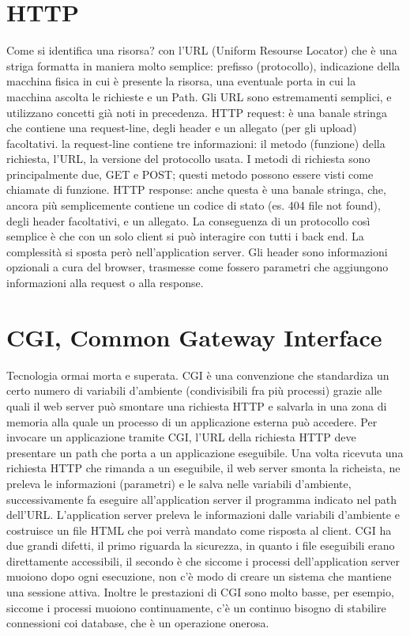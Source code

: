 \section{HTTP}
Come si identifica una risorsa? con l'URL (Uniform Resourse Locator) che è una striga formatta in maniera molto semplice: prefisso (protocollo), indicazione della macchina fisica in cui è presente la risorsa, una eventuale porta in cui la macchina ascolta le richieste e un Path. Gli URL sono estremamenti semplici, e utilizzano concetti già noti in precedenza.\newline
HTTP request: è una banale stringa che contiene una request-line, degli header e un allegato (per gli upload) facoltativi. la request-line contiene tre informazioni: il metodo (funzione) della richiesta, l'URL, la versione del protocollo usata. I metodi di richiesta sono principalmente due, GET e POST; questi metodo possono essere visti come chiamate di funzione.\newline
HTTP response: anche questa è una banale stringa, che, ancora più semplicemente contiene un codice di stato (es. 404 file not found), degli header facoltativi, e un allegato.\newline
La conseguenza di un protocollo così semplice è che con un solo client si può interagire con tutti i back end. La complessità si sposta però nell'application server.\newline
Gli header sono informazioni opzionali a cura del browser, trasmesse come fossero parametri che aggiungono informazioni alla request o alla response.
\section{CGI, Common Gateway Interface}
Tecnologia ormai morta e superata.\newline
CGI è una convenzione che standardiza un certo numero di variabili d'ambiente (condivisibili fra più processi) grazie alle quali il web server può smontare una richiesta HTTP e salvarla in una zona di memoria alla quale un processo di un applicazione esterna può accedere.\newline
Per invocare un applicazione tramite CGI, l'URL della richiesta HTTP deve presentare un path che porta a un applicazione eseguibile. Una volta ricevuta una richiesta HTTP che rimanda a un eseguibile, il web server smonta la richeista, ne preleva le informazioni (parametri) e le salva nelle variabili d'ambiente, successivamente fa eseguire all'application server il programma indicato nel path dell'URL. L'application server preleva le informazioni dalle variabili d'ambiente e costruisce un file HTML che poi verrà mandato come risposta al client.\newline
CGI ha due grandi difetti, il primo riguarda la sicurezza, in quanto i file eseguibili erano direttamente accessibili, il secondo è che siccome i processi dell'application server muoiono dopo ogni esecuzione, non c'è modo di creare un sistema che mantiene una sessione attiva. Inoltre le prestazioni di CGI sono molto basse, per esempio, siccome i processi muoiono continuamente, c'è un continuo bisogno di stabilire connessioni coi database, che è un operazione onerosa.\newline